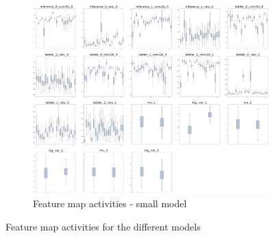 \begin{figure}
    \ContinuedFloat
    \centering
    \begin{subfigure}{.95\textwidth}
        \centering
        \includegraphics[width=\textwidth]{images/sparseness/encoder_fm3_fms.png}
        \caption{Feature map activities - small model}
    \end{subfigure}
    \caption{Feature map activities for the different models}
    \label{fig:fm_activities_sparseness}
\end{figure}
